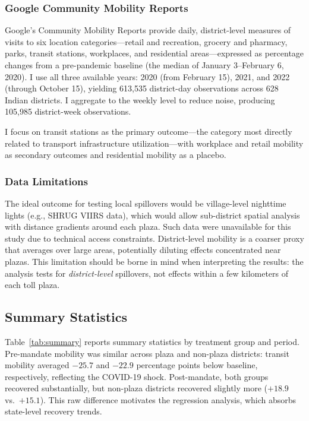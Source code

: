 \documentclass[12pt]{article}
\begin{document}
\subsubsection*{Google Community Mobility Reports} Google's Community Mobility Reports provide daily, district-level measures of visits to six location categories---retail and recreation, grocery and pharmacy, parks, transit stations, workplaces, and residential areas---expressed as percentage changes from a pre-pandemic baseline (the median of January 3--February 6, 2020). I use all three available years: 2020 (from February 15), 2021, and 2022 (through October 15), yielding 613,535 district-day observations across 628 Indian districts. I aggregate to the weekly level to reduce noise, producing 105,985 district-week observations.

I focus on transit stations as the primary outcome---the category most directly related to transport infrastructure utilization---with workplace and retail mobility as secondary outcomes and residential mobility as a placebo.

\subsubsection*{Data Limitations} The ideal outcome for testing local spillovers would be village-level nighttime lights (e.g., SHRUG VIIRS data), which would allow sub-district spatial analysis with distance gradients around each plaza. Such data were unavailable for this study due to technical access constraints. District-level mobility is a coarser proxy that averages over large areas, potentially diluting effects concentrated near plazas. This limitation should be borne in mind when interpreting the results: the analysis tests for \textit{district-level} spillovers, not effects within a few kilometers of each toll plaza.

\subsection{Summary Statistics}



Table~\ref{tab:summary} reports summary statistics by treatment group and period. Pre-mandate mobility was similar across plaza and non-plaza districts: transit mobility averaged $-25.7$ and $-22.9$ percentage points below baseline, respectively, reflecting the COVID-19 shock. Post-mandate, both groups recovered substantially, but non-plaza districts recovered slightly more ($+18.9$ vs.\ $+15.1$). This raw difference motivates the regression analysis, which absorbs state-level recovery trends.
\end{document}
